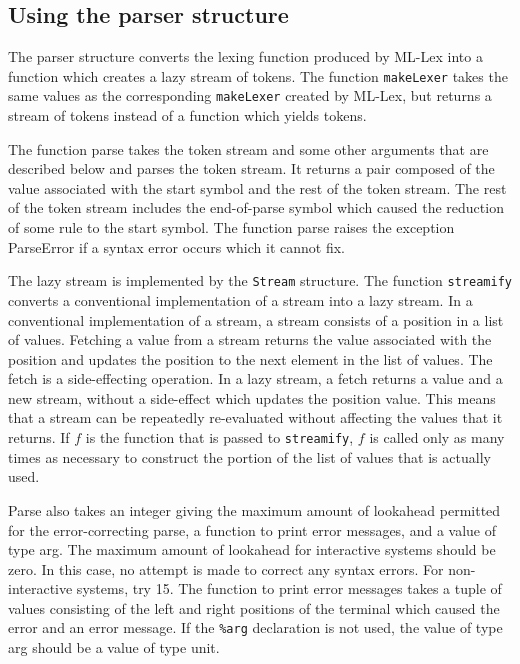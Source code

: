 \subsection{Using the parser structure}

The parser structure converts the lexing function produced by
ML-Lex into a function which creates a lazy stream of tokens.  The
function {\tt makeLexer} takes the same values as the corresponding
{\tt makeLexer} created by ML-Lex, but returns a stream of tokens
instead of a function which yields tokens.

The function parse takes the token stream and some other arguments that
are described below and parses the token stream.  It returns a pair composed
of the value associated with the start symbol and the rest of
the token stream.  The rest of the token stream includes the
end-of-parse symbol which caused the reduction of some rule
to the start symbol.  The function parse raises the
exception ParseError if a syntax error occurs which it cannot fix.

The lazy stream is implemented by the {\tt Stream} structure.
The function {\tt streamify} converts a conventional implementation
of a stream into a lazy stream.  In a conventional implementation
of a stream, a stream consists of a position in a list of
values.  Fetching a value from a stream returns the
value associated with the position and updates the position to
the next element in the list of values.  The fetch is a side-effecting
operation.  In a lazy stream, a fetch returns a value and a new
stream, without a side-effect which updates the position value.
This means that a stream can be repeatedly re-evaluated without
affecting the values that it returns.  If $f$ is the function
that is passed to {\tt streamify}, $f$ is called only as many
times as necessary to construct the portion of the list of values
that is actually used.

Parse also takes an integer giving the maximum amount of lookahead permitted
for the error-correcting parse, a function to print error messages,
and a value of type arg.  The maximum amount of lookahead for interactive
systems should be zero.  In this case, no attempt is made to correct any
syntax errors.  For non-interactive systems, try 15.  The
function to print error messages takes a tuple of values consisting
of the left and right positions of the terminal which caused the error
and an error message.   If the {\tt \%arg} declaration is not used, the
value of type arg should be a value of type unit.

